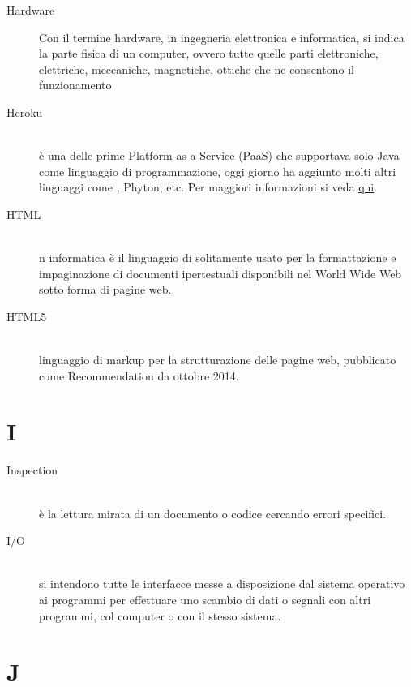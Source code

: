 \documentclass[12pt,a4paper]{article}
\begin{document}
\begin{description}
\item[Hardware] 
\hfill Con il termine hardware, in ingegneria elettronica e informatica, si indica la parte fisica di un computer, ovvero tutte quelle parti elettroniche, elettriche, meccaniche, magnetiche, ottiche che ne consentono il funzionamento\\	

\item[Heroku] 
\hfill\\ è una  delle prime  Platform-as-a-Service (PaaS) che supportava solo Java come linguaggio di programmazione, oggi giorno ha aggiunto molti altri linguaggi come , Phyton, etc. Per maggiori informazioni si veda \href{https://www.heroku.com}{qui}.

\item[HTML] 
\hfill\\ n informatica è il linguaggio di  solitamente usato per la formattazione e impaginazione di documenti ipertestuali disponibili nel World Wide Web sotto forma di pagine web.

\item[HTML5] 
\hfill\\ linguaggio di markup per la strutturazione delle pagine web, pubblicato come  Recommendation da ottobre 2014.
\end{description}
\newpage

\section{I}	

\begin{description}
\item[Inspection] 
\hfill\\ è la lettura mirata di un documento o codice cercando errori specifici.

\item[I/O] 
\hfill\\si intendono tutte le interfacce messe a disposizione dal sistema operativo ai programmi per effettuare uno scambio di dati o segnali con altri programmi, col computer o con il stesso sistema.
\end{description}

\newpage

\section{J}
\end{document}
